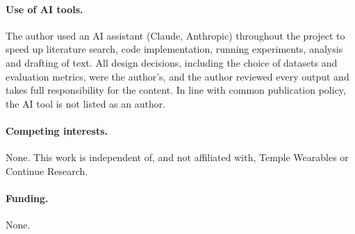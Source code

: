\paragraph{Use of AI tools.} The author used an AI assistant (Claude, Anthropic) throughout the project to speed up literature search, code implementation, running experiments, analysis and drafting of text. All design decisions, including the choice of datasets and evaluation metrics, were the author's, and the author reviewed every output and takes full responsibility for the content. In line with common publication policy, the AI tool is not listed as an author.

\paragraph{Competing interests.} None. This work is independent of, and not affiliated with, Temple Wearables or Continue Research.

\paragraph{Funding.} None.
